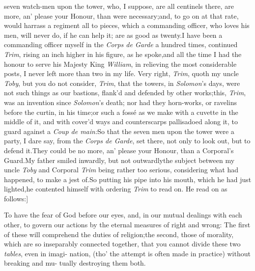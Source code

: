 \documentclass{article}
\begin{document}
\noindent
{}
seven watch-men upon the tower, who, I suppose, are all centinels there,\tsk
are more,
an’ please your Honour, than were necessary;\tsk and, to go
on at that rate, would harrass a regiment all to pieces, which
a commanding officer, who loves his men, will never do, if he can
help it;\break
{}
are as good as
twenty.\tsk I have been a commanding officer myself in the
\textit{Corps de Garde} a hundred times, continued \textit{Trim},
rising an inch higher in his figure, as he spoke,\tsk and all the
time I had the honour to serve his Majesty King \textit{William}, in
relieving the most considerable posts, I never left more than two
in my life.\tsk{}
Very right, \textit{Trim}, quoth my uncle \textit{Toby},\break
\tsk but you do not consider, \textit{Trim}, that the
towers, in \textit{Solomon}’s days, were not such things as our
bastions, flank’d and defended by other works;\tsk this,
\textit{Trim}, was an invention since \textit{Solomon}’s death;
nor had they horn-works, or ravelins before the curtin, in his
time;\tsk or such a fossé as we make with a cuvette
in the middle of it, and with cover’d ways and counterscarps
pallisadoed along it, to guard against a \textit{Coup de
main:}\tsk So that the seven men upon the tower were a party,
I dare say, from the \textit{Corps de Garde}, set there, not only to
look out, but to defend it.\tsk They could be no more, an’
please your Honour, than a Corporal’s Guard.\tsk My father
smiled inwardly,\tsk\break
but not outwardly\tsk the subject between
my uncle \textit{Toby} and Corporal \textit{Trim} being rather
too serious, considering what had happened, to make a jest
of.\tsk So putting his pipe into his mouth, which he had just
lighted,\tsk he contented himself with ordering \textit{Trim} to
read on. He read on as follows:]

\lqq To have the fear of God before our\break
\lqq eyes, and, in our mutual dealings with\break
\lqq each other, to govern our actions by the\break
\lqq eternal measures of right and wrong:\tsk\break
\lqq The first of these will comprehend the\break
\lqq duties of religion;\tsh the second, those\break
\lqq of morality, which are so inseparably\break
\lqq connected together, that you cannot\break
\lqq divide these two \textit{tables}, even in imagi-\break
\lqq nation, (tho’ the attempt is often made\break
\lqq in practice) without breaking and mu-\break
\lqq tually destroying them both.  
\end{document}
